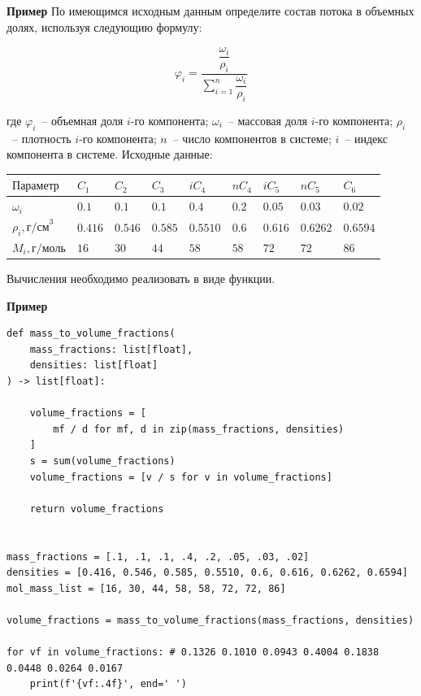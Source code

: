 \documentclass[aspectratio=169, mathserif]{beamer}%
\begin{document}
\begin{frame}[fragile]{\textcolor{tpugreen}{\textbf{Пример}}}
\scriptsize
По имеющимся исходным данным определите состав потока в объемных долях, используя следующию формулу:
\begin{normalsize}
\begin{equation*}
	\varphi _i = \dfrac{\dfrac{\omega _i}{\rho _i}}{\sum \limits _{i=1}^{n} \dfrac{\omega _i}{\rho _i}} 
\end{equation*}
\end{normalsize}
где $\varphi _i$~-- объемная доля $i$-го компонента; $\omega _i$~-- массовая доля $i$-го компонента; $\rho _i$~-- плотность $i$-го компонента; $n$~-- число компонентов в системе; $i$~-- индекс компонента в системе.
Исходные данные:
\begin{table}[h!]
	\begin{tabular}{|p{.2\linewidth}|p{.05\linewidth}|p{.05\linewidth}|p{.05\linewidth}|p{.05\linewidth}|p{.05\linewidth}|p{.05\linewidth}|p{.05\linewidth}|p{.05\linewidth}|}
		\hline
		$\mathrm{Параметр}$ & $C_1$ & $C_2$ & $C_3$ & $iC_4$ & $nC_4$ & $iC_5$ & $nC_5$ & $C_6$ \\
		\hline
		$\omega _i$ & $0.1$ & $0.1$ & $0.1$ & $0.4$ & $0.2$ & $0.05$ & $0.03$ & $0.02$ \\
		\hline
		$\rho_i, \mathrm{г/см}^3$ & $0.416$ & $0.546$ & $0.585$ & $0.5510$ & $0.6$ & $0.616$ & $0.6262$ & $0.6594$\\
		\hline
		$M_i, \mathrm{г/моль}$ & $16$ & $30$ & $44$ & $58$ & $58$ & $72$ & $72$ & $86$ \\
		\hline
	\end{tabular}
\end{table}
Вычисления необходимо реализовать в виде функции.
\vfill
\end{frame}

\begin{frame}[fragile]{\textcolor{tpugreen}{\textbf{Пример}}}
\scriptsize
\begin{verbatim}
def mass_to_volume_fractions(
    mass_fractions: list[float],
    densities: list[float]
) -> list[float]:
    
    volume_fractions = [
        mf / d for mf, d in zip(mass_fractions, densities)
    ]
    s = sum(volume_fractions)
    volume_fractions = [v / s for v in volume_fractions]
    
    return volume_fractions


mass_fractions = [.1, .1, .1, .4, .2, .05, .03, .02]
densities = [0.416, 0.546, 0.585, 0.5510, 0.6, 0.616, 0.6262, 0.6594]
mol_mass_list = [16, 30, 44, 58, 58, 72, 72, 86]

volume_fractions = mass_to_volume_fractions(mass_fractions, densities)

for vf in volume_fractions: # 0.1326 0.1010 0.0943 0.4004 0.1838 0.0448 0.0264 0.0167
    print(f'{vf:.4f}', end=' ')  
\end{verbatim}
\vfill
\end{frame}
\end{document}
